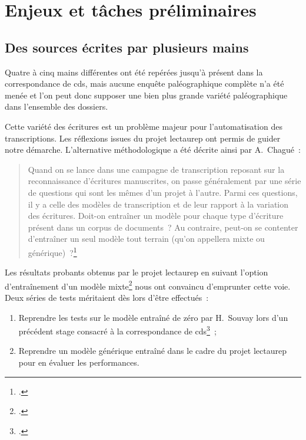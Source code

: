 \documentclass[a4paper,12pt,twoside]{book}
\begin{document}
		\section{Enjeux et tâches préliminaires}
			
			\subsection{Des sources écrites par plusieurs mains}
				Quatre à cinq mains différentes ont été repérées jusqu'à présent dans la correspondance de \gls{cds}, mais aucune enquête paléographique complète n'a été menée et l'on peut donc supposer une bien plus grande variété paléographique dans l'ensemble des dossiers.
				
				Cette variété des écritures est un problème majeur pour l'automatisation des transcriptions. Les réflexions issues du projet \gls{lectaurep} ont permis de guider notre démarche. L'alternative méthodologique a été décrite ainsi par A.~Chagué~:
				
				\begin{quotation}
					Quand on se lance dans une campagne de transcription reposant sur la reconnaissance d’écritures manuscrites, on passe généralement par une série de questions qui sont les mêmes d’un projet à l’autre. Parmi ces questions, il y a celle des modèles de transcription et de leur rapport à la variation des écritures. Doit-on entraîner un modèle pour chaque type d’écriture présent dans un corpus de documents~? Au contraire, peut-on se contenter d’entraîner un seul modèle tout terrain (qu’on appellera mixte ou générique)~?\footcite{chagueCreationModelesTranscription}
				\end{quotation}
			
				Les résultats probants obtenus par le projet \gls{lectaurep} en suivant l'option d'entraînement d'un modèle mixte\footcite{chagueCreationModelesTranscriptiona} nous ont convaincu d'emprunter cette voie. Deux séries de tests méritaient dès lors d'être effectués~:
		
				\begin{enumerate}
					\item Reprendre les tests sur le modèle entraîné de zéro par H.~Souvay lors d'un précédent stage consacré à la correspondance de \gls{cds}\footcite{souvayCorrespondanceConstanceSalm2021}~;
					\item Reprendre un modèle générique entraîné dans le cadre du projet \gls{lectaurep} pour en évaluer les performances.
				\end{enumerate}
		
\end{document}
